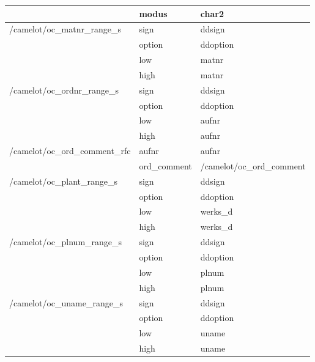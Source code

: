 \begin{longtabu}{p{0.33\textwidth}p{0.3\textwidth}p{0.3\textwidth }}
	& modus & char2 \\ \hline
	/camelot/oc\_matnr\_range\_s & sign & ddsign \\
	& option & ddoption \\
	& low & matnr \\
	& high & matnr \\ \hline
	/camelot/oc\_ordnr\_range\_s & sign & ddsign \\
	& option & ddoption \\
	& low & aufnr \\
	& high & aufnr \\ \hline
	/camelot/oc\_ord\_comment\_rfc & aufnr & aufnr \\
	& ord\_comment & /camelot/oc\_ord\_comment \\ \hline
	/camelot/oc\_plant\_range\_s & sign & ddsign \\
	& option & ddoption \\
	& low & werks\_d \\
	& high & werks\_d \\ \hline
	/camelot/oc\_plnum\_range\_s & sign & ddsign \\
	& option & ddoption \\
	& low & plnum \\
	& high & plnum \\ \hline
	/camelot/oc\_uname\_range\_s & sign & ddsign \\
	& option & ddoption \\
	& low & uname \\
	& high & uname \\ \hline
\end{longtabu}